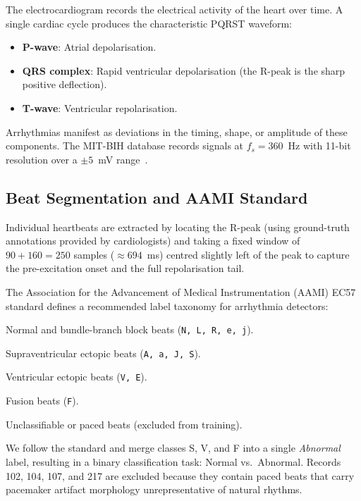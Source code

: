 \documentclass[12pt,a4paper]{article}
\begin{document}
The electrocardiogram records the electrical activity of the heart over time.
A single cardiac cycle produces the characteristic PQRST waveform:
\begin{itemize}[leftmargin=*]
    \item \textbf{P-wave}: Atrial depolarisation.
    \item \textbf{QRS complex}: Rapid ventricular depolarisation (the R-peak is
          the sharp positive deflection).
    \item \textbf{T-wave}: Ventricular repolarisation.
\end{itemize}
Arrhythmias manifest as deviations in the timing, shape, or amplitude of these
components.  The MIT-BIH database records signals at $f_s = 360$~Hz with 11-bit
resolution over a $\pm 5$~mV range~\cite{moody2001mitbih}.

\subsection{Beat Segmentation and AAMI Standard}

Individual heartbeats are extracted by locating the R-peak (using ground-truth
annotations provided by cardiologists) and taking a fixed window of
$90 + 160 = 250$ samples ($\approx 694$~ms) centred slightly left of the peak
to capture the pre-excitation onset and the full repolarisation tail.

The Association for the Advancement of Medical Instrumentation (AAMI) EC57
standard \cite{aami2012} defines a recommended label taxonomy for arrhythmia
detectors:
\begin{description}[leftmargin=3em, labelwidth=1.5em]
    \item[N] Normal and bundle-branch block beats
          (\texttt{N, L, R, e, j}).
    \item[S] Supraventricular ectopic beats
          (\texttt{A, a, J, S}).
    \item[V] Ventricular ectopic beats
          (\texttt{V, E}).
    \item[F] Fusion beats (\texttt{F}).
    \item[Q] Unclassifiable or paced beats (excluded from training).
\end{description}
We follow the standard and merge classes S, V, and F into a single
\emph{Abnormal} label, resulting in a binary classification task: Normal vs.\
Abnormal.  Records 102, 104, 107, and 217 are excluded because they contain
paced beats that carry pacemaker artifact morphology unrepresentative of natural
rhythms.
\end{document}
